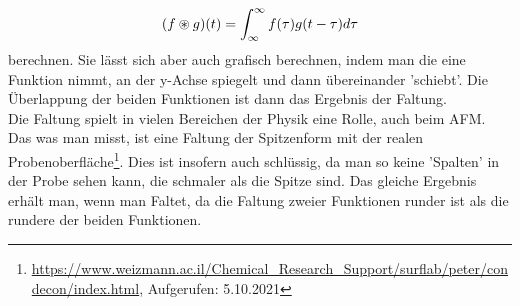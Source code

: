 \begin{equation*}
    (f \circledast g)(t) = \int_{\-\infty}^\infty f(\tau)g(t-\tau) d\tau
\end{equation*}
berechnen. Sie lässt sich aber auch grafisch berechnen, indem man die eine Funktion nimmt, an der y-Achse spiegelt und dann übereinander 'schiebt'. 
Die Überlappung der beiden Funktionen ist dann das Ergebnis der Faltung. \\

Die Faltung spielt in vielen Bereichen der Physik eine Rolle, auch beim AFM. Das was man misst, ist eine Faltung der Spitzenform mit der realen Probenoberfläche\footnote{\url{https://www.weizmann.ac.il/Chemical_Research_Support/surflab/peter/condecon/index.html}, Aufgerufen: 5.10.2021}. 
Dies ist insofern auch schlüssig, da man so keine 'Spalten' in der Probe sehen kann, die schmaler als die Spitze sind. Das gleiche Ergebnis erhält man, wenn man Faltet, da die Faltung 
zweier Funktionen runder ist als die rundere der beiden Funktionen.